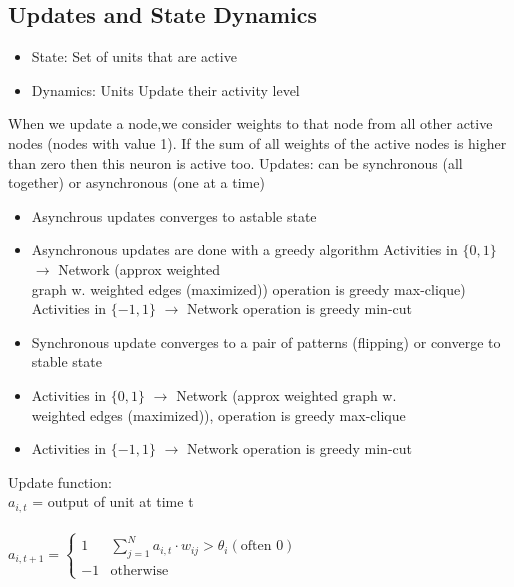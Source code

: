 \documentclass[english,11pt]{article}
\begin{document}
\subsection{Updates and State Dynamics}
\begin{itemize}[label={}]
\item State: Set of units that are active
\item Dynamics: Units Update their activity level
\end{itemize}
When we update a node,we consider weights to that node from all other active nodes (nodes with value 1).
If the sum of all weights of the active nodes is higher than zero then this neuron is active too.
Updates: can be synchronous (all together) or asynchronous (one at a time)
\begin{itemize}[label={}] \item Asynchrous updates converges to astable state
\item Asynchronous updates are done with a greedy algorithm
\subitem Activities in $\{0,1\}$ $\rightarrow$ Network (approx weighted\\ graph w. weighted edges (maximized)) operation is greedy max-clique)
\subitem Activities in $\{-1,1\}$ $\rightarrow$ Network operation is greedy min-cut
\item Synchronous update converges to a pair of patterns (flipping) or converge to stable state
\item Activities in $\{0,1\}$ $\rightarrow$	Network (approx weighted graph w. \\weighted edges (maximized)), operation is greedy max-clique
\item Activities in $\{-1,1\}$ $\rightarrow$ Network operation is greedy min-cut
\end{itemize}
Update function:\\
$a_{i,t}$ = output of unit at time t\\\\
$a_{i,t+1} =
\left\{
	\begin{array}{ll}
		1   & \sum_{j=1}^N a_{i,t}\cdot w_{ij} > \theta_i (\mbox{often 0}) \\
		-1 & \mbox{otherwise}
	\end{array}
\right.$
\end{document}
